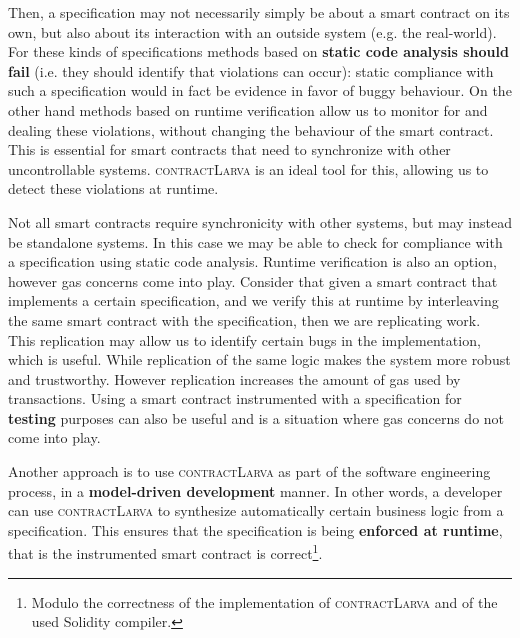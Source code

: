 \documentclass{article}
\newcommand{\contractlarva}{\textsc{contractLarva}\xspace}
\begin{document}
  Then, a specification may not necessarily simply be about a smart contract on its own, but also about its interaction with an outside system (e.g. the real-world). For these kinds of specifications methods based on \textbf{static code analysis should fail} (i.e. they should identify that violations can occur): static compliance with such a specification would in fact be evidence in favor of buggy behaviour. On the other hand methods based on runtime verification allow us to monitor for and dealing these violations, without changing the behaviour of the smart contract. This is essential for smart contracts that need to synchronize with other uncontrollable systems. \contractlarva is an ideal tool for this, allowing us to detect these violations at runtime.
  
   
   Not all smart contracts require synchronicity with other systems, but may instead be standalone systems. In this case we may be able to check for compliance with a specification using static code analysis. Runtime verification is also an option, however gas concerns come into play. Consider that given a smart contract that implements a certain specification, and we verify this at runtime by interleaving the same smart contract with the specification, then we are replicating work. This replication may allow us to identify certain bugs in the implementation, which is useful. While replication of the same logic makes the system more robust and trustworthy. However replication increases the amount of gas used by transactions. Using a smart contract instrumented with a specification for \textbf{testing} purposes can also be useful and is a situation where gas concerns do not come into play. 
   
   Another approach is to use \contractlarva as part of the software engineering process, in a \textbf{model-driven development} manner. In other words, a developer can use \contractlarva to synthesize automatically certain business logic from a specification. This ensures that the specification is being \textbf{enforced at runtime}, that is the instrumented smart contract is correct\footnote{Modulo the correctness of the implementation of \contractlarva and of the used Solidity compiler.}.
   
\end{document}
